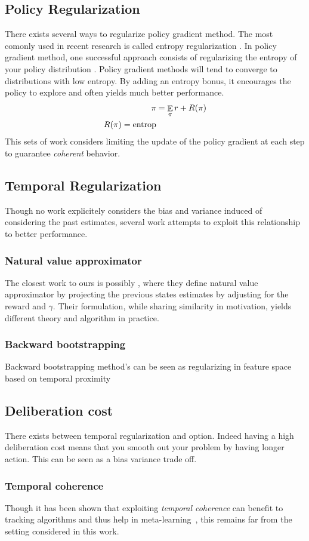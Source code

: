 \subsection{Policy Regularization}
There exists several ways to regularize policy gradient method. The most comonly used in recent research is called entropy regularization \cite{neu2017unified,schulman2017proximal,bartlett2009regal}.
In policy gradient method, one successful approach consists of regularizing the entropy of your policy distribution \cite{neu2017unified}. Policy gradient methods will tend to converge to distributions with low entropy. By adding an entropy bonus, it encourages the policy to explore and often yields much better performance.
\begin{equation}
\begin{split}
    \pi &= \mathop{\mathbb{E}}_{\pi}{r} + R(\pi)\\
    R(\pi) = \text{entrop}
\end{split}
\end{equation}
This sets of work \cite{schulman2017proximal,schulman2015trust} considers limiting the update of the policy gradient at each step to guarantee \emph{coherent} behavior. 


\subsection{Temporal Regularization}
Though no work explicitely considers the bias and variance induced of considering the past estimates, several work attempts to exploit this relationship to better performance.
\subsubsection{Natural value approximator}
The closest work to ours is possibly \cite{xu2017natural}, where they define natural value approximator by projecting the previous states estimates by adjusting for the reward and $\gamma$. Their formulation, while sharing similarity in motivation, yields different theory and algorithm in practice.
\subsubsection{Backward bootstrapping}
Backward bootstrapping method's can be seen as regularizing in feature space based on temporal proximity \cite{sutton2009fast,li2008worst,baird1995residual}
\subsection{Deliberation cost}
There exists between temporal regularization and option. Indeed having a high deliberation cost \cite{harb2017waiting} means that you smooth out your problem by having longer action. This can be seen as a bias variance trade off. 
\subsubsection{Temporal coherence}
Though it has been shown that exploiting \emph{temporal coherence} can benefit to tracking algorithms and thus help in meta-learning~\cite{sutton2007role}, this remains far from the setting considered in this work.


